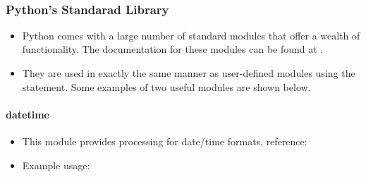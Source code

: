\documentclass[letterpaper,10pt,english,openany]{sphinxmanual}
\begin{document}
\begin{sphinxVerbatim}[commandchars=\\\{\}]
  
    
  
\end{sphinxVerbatim}


\subsubsection{Python’s Standarad Library}
\label{\detokenize{introduction_to_python/using_modules:python-s-standarad-library}}\begin{itemize}
\item {} 
Python comes with a large number of standard modules that offer a
wealth of functionality. The documentation for these modules can be
found at .

\item {} 
They are used in exactly the same manner as user-defined modules
using the  statement. Some examples of two useful modules
are shown below.

\end{itemize}


\paragraph{datetime}
\label{\detokenize{introduction_to_python/using_modules:datetime}}\begin{itemize}
\item {} 
This module provides processing for date/time formats, reference:

\item {} 
Example usage:

\end{itemize}
\end{document}
